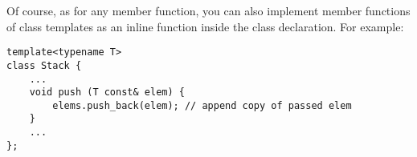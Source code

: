 Of course, as for any member function, you can also implement member functions of class templates as an inline function inside the class declaration. For example:

\begin{lstlisting}[style=styleCXX]
template<typename T>
class Stack {
	...
	void push (T const& elem) {
		elems.push_back(elem); // append copy of passed elem
	}
	...
};
\end{lstlisting}






